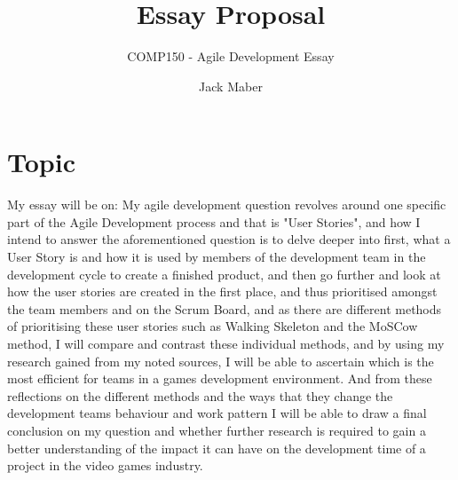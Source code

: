\documentclass{scrartcl}
\title{Essay Proposal}
\subtitle{COMP150 - Agile Development Essay}
\author{Jack Maber}
\begin{document}
\maketitle

\section*{Topic}

My essay will be on: My agile development question revolves around one specific part of the Agile Development process and that is "User Stories", and how I intend to answer the aforementioned question is to delve deeper into first, what a User Story is and how it is used by members of the development team in the development cycle to create a finished product, and then go further and look at how the user stories are created in the first place, and thus prioritised amongst the team members and on the Scrum Board, and as there are different methods of prioritising these user stories such as Walking Skeleton and the MoSCow method, I will compare and contrast these individual methods, and by using my research gained from my noted sources, I will be able to ascertain which is the most efficient for teams in a games development environment. And from these reflections on the different methods and the ways that they change the development teams behaviour and work pattern I will be able to draw a final conclusion on my question and whether further research is required to gain a better understanding of the impact it can have on the development time of a project in the video games industry.
\end{document}
